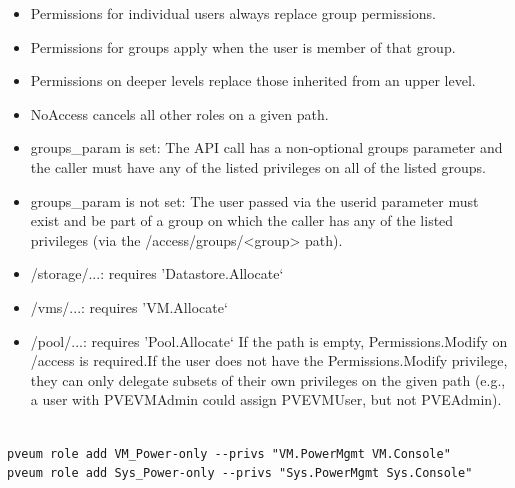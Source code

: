 \begin{itemize}[leftmargin=2cm]

	\item Permissions for individual users always replace group permissions.

	\item Permissions for groups apply when the user is member of that group.

	\item Permissions on deeper levels replace those inherited from an upper level.

	\item NoAccess cancels all other roles on a given path.

\end{itemize}

\begin{itemize}[leftmargin=2cm]

	\item groups_param is set: The API call has a non-optional groups parameter and the caller must have any of the listed privileges on all of the listed groups.

	\item groups_param is not set: The user passed via the userid parameter must exist and be part of a group on which the caller has any of the listed privileges (via the /access/groups/<group> path).

\end{itemize}

\begin{itemize}[leftmargin=2cm]

	\item /storage/...: requires 'Datastore.Allocate`

	\item /vms/...: requires 'VM.Allocate`

	\item /pool/...: requires 'Pool.Allocate` If the path is empty, Permissions.Modify on /access is required.If the user does not have the Permissions.Modify privilege, they can only delegate subsets of their own privileges on the given path (e.g., a user with PVEVMAdmin could assign PVEVMUser, but not PVEAdmin).

\end{itemize}

\begin{lstlisting}

pveum role add VM_Power-only --privs "VM.PowerMgmt VM.Console"
pveum role add Sys_Power-only --privs "Sys.PowerMgmt Sys.Console"

\end{lstlisting}


